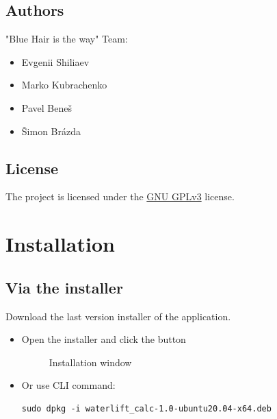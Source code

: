 \documentclass[a5paper, 10pt]{article}
\begin{document}
    \subsection{Authors}
        "Blue Hair is the way" Team:
        \begin{itemize}
            \item Evgenii Shiliaev
            \item Marko Kubrachenko
            \item Pavel Beneš
            \item Šimon Brázda
        \end{itemize}

    \subsection{License}
        The project is licensed under the \href{https://choosealicense.com/licenses/gpl-3.0/}{GNU GPLv3} license.

\pagebreak

\section{Installation}
    \subsection{Via the installer}
        Download the last version installer of the application.
        \begin{itemize}
            \item Open the installer and click the  button
            \begin{figure}[h]
                \centering
                \caption{Installation window}
                \label{fig:installation_window}
            \end{figure}
    
            \item Or use CLI command:
            \lstset{language=bash, frame=lines}
            \begin{lstlisting}
sudo dpkg -i waterlift_calc-1.0-ubuntu20.04-x64.deb
            \end{lstlisting}
        \end{itemize}
        
\end{document}
